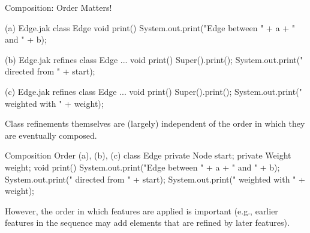 \begin{frame}[fragile]{Composition: Order Matters!}
	\small
	\begin{mycolumns}[animation=none]
\begin{codetight}[style=footnotesize]{(a) Edge.jak}
class Edge {
	void print() {
		System.out.print("Edge between " + a + " and " + b);
	}
}
\end{codetight}
\begin{codetight}[style=footnotesize]{(b) Edge.jak}
refines class Edge { ...
	void print() {
		Super().print();
		System.out.print(" directed from " + start);
	}
}
\end{codetight}
\begin{codetight}[style=footnotesize]{(c) Edge.jak}
refines class Edge { ...
	void print() {
		Super().print();
		System.out.print(" weighted with " + weight);
	}
}
\end{codetight}
	\mynextcolumn
		\begin{note}{}
			Class refinements themselves are (largely) independent of the order in which they are eventually composed.
		\end{note}
\begin{codetight}[style=footnotesize]{Composition Order (a), (b), (c)}
class Edge {
	private Node start;
	private Weight weight;
	void print() {
		System.out.print("Edge between " + a + " and " + b);
		System.out.print(" directed from " + start);
		System.out.print(" weighted with " + weight);
	}
}
\end{codetight}
		\begin{note}{}
			However, the order in which features are applied is important 
			(e.g., earlier features in the sequence may add elements that are refined by later features). 
		\end{note}
	\end{mycolumns}
\end{frame}

